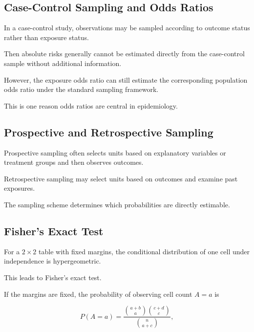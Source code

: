 \subsection{Case-Control Sampling and Odds Ratios}
\label{subsec:case-control-odds-ratio}

In a case-control study, observations may be sampled according to outcome
status rather than exposure status.

Then absolute risks generally cannot be estimated directly from the
case-control sample without additional information.

However, the exposure odds ratio can still estimate the corresponding
population odds ratio under the standard sampling framework.

This is one reason odds ratios are central in epidemiology.

\subsection{Prospective and Retrospective Sampling}
\label{subsec:prospective-retrospective}

Prospective sampling often selects units based on explanatory variables
or treatment groups and then observes outcomes.

Retrospective sampling may select units based on outcomes and examine
past exposures.

The sampling scheme determines which probabilities are directly
estimable.

\subsection{Fisher's Exact Test}
\label{subsec:fishers-exact-test}

For a \(2\times2\) table with fixed margins, the conditional distribution
of one cell under independence is hypergeometric.

This leads to Fisher's exact test.

If the margins are fixed, the probability of observing cell count \(A=a\)
is

\[
\boxed{
P(A=a)
=
\frac{
\binom{a+b}{a}
\binom{c+d}{c}
}{
\binom{n}{a+c}
},
}
\]

